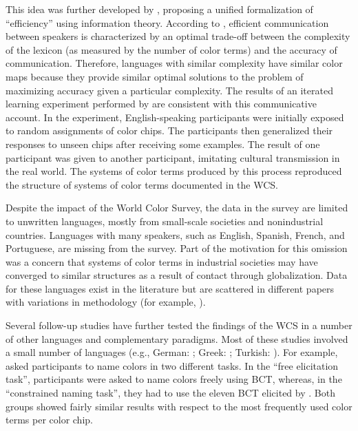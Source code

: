 This idea was further developed by \textcite{zaslavskyEfficient2018}, proposing a unified formalization of “efficiency” using information theory. According to \textcite{zaslavskyEfficient2018}, efficient communication between speakers is characterized by an optimal trade-off between the complexity of the lexicon (as measured by the number of color terms) and the accuracy of communication. Therefore, languages with similar complexity have similar color maps because they provide similar optimal solutions to the problem of maximizing accuracy given a particular complexity.
The results of an iterated learning experiment performed by \textcite{xuCultural2013} are consistent with this communicative account. In the experiment, English-speaking participants were initially exposed to random assignments of color chips. The participants then generalized their responses to unseen chips after receiving some examples. The result of one participant was given to another participant, imitating cultural transmission in the real world. The systems of color terms produced by this process reproduced the structure of systems of color terms documented in the WCS.


Despite the impact of the World Color Survey, the data in the survey are limited to unwritten languages, mostly from small-scale societies and nonindustrial countries. Languages with many speakers, such as English, Spanish, French, and Portuguese, are missing from the survey. Part of the motivation for this omission was a concern that systems of color terms in industrial societies may have converged to similar structures as a result of contact through globalization. Data for these languages exist in the literature but are scattered in different papers with variations in methodology (for example, \textcite{forbesStructural1976, josserand:hal-03900005, lindseyColor2014, xuComparison2023}).


Several follow-up studies have further tested the findings of the WCS in a number of other languages and complementary paradigms. Most of these studies involved a small number of languages (e.g., German: \textcite{zollingerWhy1984}; Greek: \textcite{thierryUnconscious2009}; Turkish: \textcite{ozgenTurkish1998}). For example,\textcite{lindseyColor2014} asked participants to name colors in two different tasks. In the ``free elicitation task'', participants were asked to name colors freely using BCT, whereas, in the ``constrained naming task'', they had to use the eleven BCT elicited by \textcite{berlinBasic1969}.
Both groups showed fairly similar results with respect to the most frequently used color terms per color chip.

